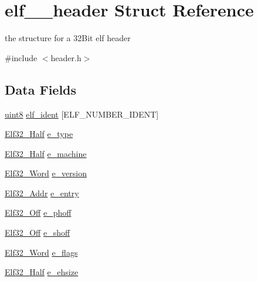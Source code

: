 \hypertarget{structelf__32__header}{
\section{elf\_\_\-header Struct Reference}
\label{structelf__32__header}
}


the structure for a 32Bit elf header  




{\ttfamily \#include $<$header.h$>$}

\subsection*{Data Fields}
\begin{DoxyCompactItemize}
\item 
\hyperlink{int__types_8h_adde6aaee8457bee49c2a92621fe22b79}{uint8} \hyperlink{structelf__32__header_ad6b49380ff71793547a712aa8d24c5fe}{elf\_\-ident} \mbox{[}ELF\_\-NUMBER\_\-IDENT\mbox{]}
\item 
\hyperlink{header_8h_a36b5c3e0acdf5b2949591cd07480d10b}{Elf32\_\-Half} \hyperlink{structelf__32__header_a9b5c0b9a83cd0c472290a81676b4119f}{e\_\-type}
\item 
\hyperlink{header_8h_a36b5c3e0acdf5b2949591cd07480d10b}{Elf32\_\-Half} \hyperlink{structelf__32__header_a4fc95a48457d0bbf3937dfabcb4152ba}{e\_\-machine}
\item 
\hyperlink{header_8h_aaf2adb6079d594afee7de40cee594c34}{Elf32\_\-Word} \hyperlink{structelf__32__header_ab8b2dd687058469e74ec1cda4e924add}{e\_\-version}
\item 
\hyperlink{header_8h_a6041cee195469c34b94c8605b53a98f9}{Elf32\_\-Addr} \hyperlink{structelf__32__header_a6c0fef788e2dc2043aa91b26429459bf}{e\_\-entry}
\item 
\hyperlink{header_8h_aa29786fd537fb0970d39bb3b9ed48e96}{Elf32\_\-Off} \hyperlink{structelf__32__header_a3d616010b5daba4da505f8f3ab1f3431}{e\_\-phoff}
\item 
\hyperlink{header_8h_aa29786fd537fb0970d39bb3b9ed48e96}{Elf32\_\-Off} \hyperlink{structelf__32__header_aeb68c7843a97cbff85af083bbe583ae0}{e\_\-shoff}
\item 
\hyperlink{header_8h_aaf2adb6079d594afee7de40cee594c34}{Elf32\_\-Word} \hyperlink{structelf__32__header_a8f71f679060089292a31b5e948815215}{e\_\-flags}
\item 
\hyperlink{header_8h_a36b5c3e0acdf5b2949591cd07480d10b}{Elf32\_\-Half} \hyperlink{structelf__32__header_accab601e805e6f7088fcf56e50cde7d0}{e\_\-ehsize}

\end{DoxyCompactItemize}
